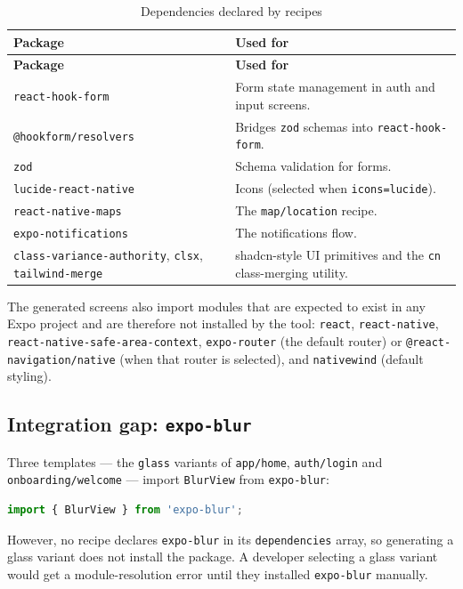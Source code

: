 \begin{longtable}{@{}L{5.4cm}L{8.8cm}@{}}
\caption{Dependencies declared by recipes}\\
\toprule
\textbf{Package} & \textbf{Used for} \\
\midrule
\endfirsthead
\toprule
\textbf{Package} & \textbf{Used for} \\
\midrule
\endhead
\texttt{react-hook-form} & Form state management in auth and input screens. \\
\texttt{@hookform/resolvers} & Bridges \texttt{zod} schemas into
\texttt{react-hook-form}. \\
\texttt{zod} & Schema validation for forms. \\
\texttt{lucide-react-native} & Icons (selected when \texttt{icons=lucide}). \\
\texttt{react-native-maps} & The \texttt{map/location} recipe. \\
\texttt{expo-notifications} & The notifications flow. \\
\texttt{class-variance-authority}, \texttt{clsx}, \texttt{tailwind-merge} &
shadcn-style UI primitives and the \texttt{cn} class-merging utility. \\
\bottomrule
\end{longtable}

The generated screens also import modules that are expected to exist in any Expo
project and are therefore not installed by the tool: \texttt{react},
\texttt{react-native}, \texttt{react-native-safe-area-context},
\texttt{expo-router} (the default router) or \texttt{@react-navigation/native}
(when that router is selected), and \texttt{nativewind} (default styling).

\subsection*{Integration gap: \texttt{expo-blur}}

Three templates --- the \texttt{glass} variants of \texttt{app/home},
\texttt{auth/login} and \texttt{onboarding/welcome} --- import
\texttt{BlurView} from \texttt{expo-blur}:

\begin{lstlisting}[language=JavaScript]
import { BlurView } from 'expo-blur';
\end{lstlisting}

However, no recipe declares \texttt{expo-blur} in its \texttt{dependencies}
array, so generating a glass variant does not install the package. A developer
selecting a glass variant would get a module-resolution error until they
installed \texttt{expo-blur} manually.

